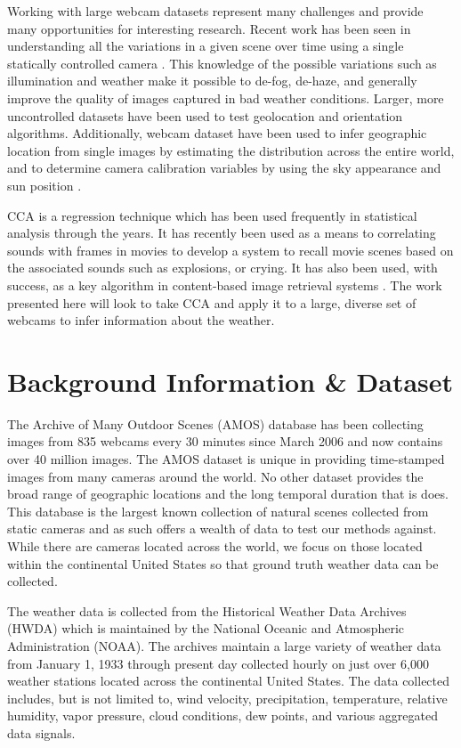 Working with large webcam datasets represent many challenges and provide many opportunities for interesting research. Recent work has been seen in understanding all the variations in a given scene over time using a single statically controlled camera \cite{CAVE_0059}. This knowledge of the possible variations such as illumination and weather make it possible to de-fog, de-haze, and generally improve the quality of images captured in bad weather conditions. Larger, more uncontrolled datasets have been used to test geolocation \cite{jacobs07geolocate} and orientation \cite{jacobs08geoorient} algorithms. Additionally, webcam dataset have been used to infer geographic location from single images \cite{im2gps} by estimating the distribution across the entire world, and to determine camera calibration variables by using the sky appearance and sun position \cite{lalonde-eccv-08}.

CCA is a regression technique \cite{hotelling} which has been used frequently in statistical analysis through the years. It has recently been used as a means to correlating sounds with frames in movies to develop a system to recall movie scenes based on the associated sounds \cite{957143} such as explosions, or crying. It has also been used, with success, as a key algorithm in content-based image retrieval systems \cite{1119703}. The work presented here will look to take CCA and apply it to a large, diverse set of webcams to infer information about the weather.

\section{Background Information \& Dataset}
The Archive of Many Outdoor Scenes (AMOS) database \cite{jacobs07amos} has been collecting images from 835 webcams every 30 minutes since March 2006 and now contains over 40 million images. The AMOS dataset is unique in providing time-stamped images from many cameras around the world. No other dataset provides the broad range of geographic locations and the long temporal duration that is does. This database is the largest known collection of natural scenes collected from static cameras and as such offers a wealth of data to test our methods against. While there are cameras located across the world, we focus on those located within the continental United States so that ground truth weather data can be collected.

The weather data is collected from the Historical Weather Data Archives (HWDA) \cite{noaa} which is maintained by the National Oceanic and Atmospheric Administration (NOAA). The archives maintain a large variety of weather data from January 1, 1933 through present day collected hourly on just over 6,000 weather stations located across the continental United States. The data collected includes, but is not limited to, wind velocity, precipitation, temperature, relative humidity, vapor pressure, cloud conditions, dew points, and various aggregated data signals.

